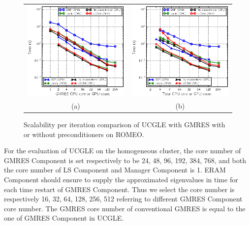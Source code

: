\begin{figure}[t]
	\centering
	\begin{tabular}{cc}
		\includegraphics[width=.48\linewidth]{fig/scalable_romeo.eps}
		&\includegraphics[width=.48\linewidth]{fig/scalable_complet_romeo.eps} \\[\abovecaptionskip]
		\small (a)& (b) 
	\end{tabular}
	\caption{Scalability per iteration comparison of UCGLE with GMRES with or without preconditioners on ROMEO.}\label{fig:myfig2}
\end{figure}

For the evaluation of UCGLE on the homogeneous cluster, the core number of GMRES Component is set respectively to be 24, 48, 96, 192, 384, 768, and both the core number of LS Component and Manager Component is 1. ERAM Component should ensure to supply the approximated eigenvalues in time for each time restart of GMRES Component. Thus we select the core number is respectively 16, 32, 64, 128, 256, 512 referring to different GMRES Component core number. The GMRES core number of conventional GMRES is equal to the one of GMRES Component in UCGLE.

